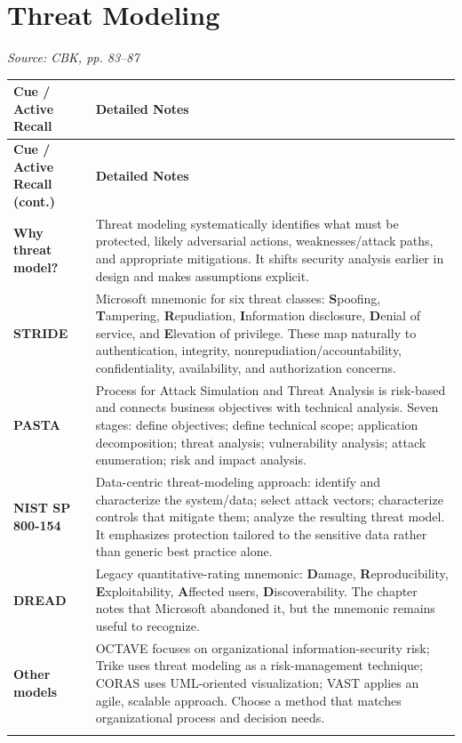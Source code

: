 \documentclass[10pt,letterpaper]{article}
\makeatletter
\newenvironment{cornell}
{\rowcolors{2}{white}{notebg}\begin{longtable}{@{}>{\raggedright\arraybackslash\columncolor{cuebg}\color{navy}\bfseries}p{0.285\textwidth}>{\raggedright\arraybackslash}p{0.65\textwidth}@{}}
\rowcolor{navy}\color{white}\textbf{Cue / Active Recall} & \color{white}\textbf{Detailed Notes}\\ \hline
\endfirsthead
\rowcolor{navy}\color{white}\textbf{Cue / Active Recall (cont.)} & \color{white}\textbf{Detailed Notes}\\ \hline
\endhead}
{\end{longtable}}
\newcommand{\noterow}[2]{#1 & #2\\\arrayrulecolor{line}\hline}
\newcommand{\source}[1]{\par{\footnotesize\color{teal}\textit{Source: CBK, #1}}\par}
\makeatother
\begin{document}
\section{\color{navy}Threat Modeling}
\source{pp. 83--87}
\begin{cornell}
\noterow{Why threat model?}{Threat modeling systematically identifies what must be protected, likely adversarial actions, weaknesses/attack paths, and appropriate mitigations. It shifts security analysis earlier in design and makes assumptions explicit.}
\noterow{STRIDE}{Microsoft mnemonic for six threat classes: \textbf{S}poofing, \textbf{T}ampering, \textbf{R}epudiation, \textbf{I}nformation disclosure, \textbf{D}enial of service, and \textbf{E}levation of privilege. These map naturally to authentication, integrity, nonrepudiation/accountability, confidentiality, availability, and authorization concerns.}
\noterow{PASTA}{Process for Attack Simulation and Threat Analysis is risk-based and connects business objectives with technical analysis. Seven stages: define objectives; define technical scope; application decomposition; threat analysis; vulnerability analysis; attack enumeration; risk and impact analysis.}
\noterow{NIST SP 800-154}{Data-centric threat-modeling approach: identify and characterize the system/data; select attack vectors; characterize controls that mitigate them; analyze the resulting threat model. It emphasizes protection tailored to the sensitive data rather than generic best practice alone.}
\noterow{DREAD}{Legacy quantitative-rating mnemonic: \textbf{D}amage, \textbf{R}eproducibility, \textbf{E}xploitability, \textbf{A}ffected users, \textbf{D}iscoverability. The chapter notes that Microsoft abandoned it, but the mnemonic remains useful to recognize.}
\noterow{Other models}{OCTAVE focuses on organizational information-security risk; Trike uses threat modeling as a risk-management technique; CORAS uses UML-oriented visualization; VAST applies an agile, scalable approach. Choose a method that matches organizational process and decision needs.}
\end{cornell}
\end{document}
